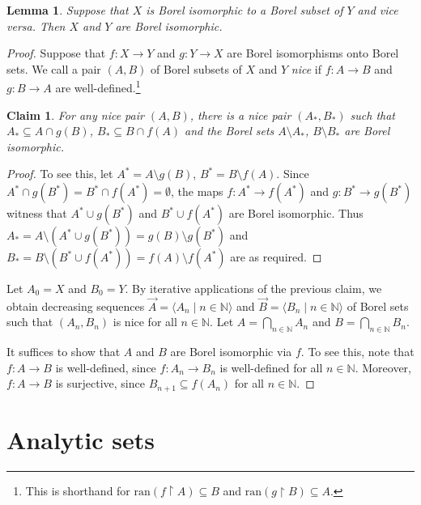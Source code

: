 \documentclass[10pt]{amsart}
\newcommand{\ran}{\mathrm{ran}}
\newcommand{\NN}{\mathbb{N}}
\newtheorem{lemma}[theorem]{Lemma}
\newtheorem*{claim*}{Claim}
\theoremstyle{definition}
\theoremstyle{remark}
\begin{document}
\begin{lemma} 
Suppose that $X$ is Borel isomorphic to a Borel subset of $Y$ and vice versa. 
Then $X$ and $Y$ are Borel isomorphic. 
\end{lemma} 
\begin{proof} 
Suppose that $f\colon X\rightarrow Y$ and $g\colon Y\rightarrow X$ are Borel isomorphisms onto Borel sets. 
We call a pair $(A,B)$ of Borel subsets of $X$ and $Y$ \emph{nice} if $f\colon A\rightarrow B$ and $g\colon B\rightarrow A$ are well-defined.\footnote{This is shorthand for $\ran(f{\upharpoonright}A)\subseteq B$ and $\ran(g{\upharpoonright}B)\subseteq A$. } 

\begin{claim*} 
For any nice pair $(A,B)$, there is a nice pair $(A_*,B_*)$ such that $A_*\subseteq A\cap g(B)$, $B_*\subseteq B\cap f(A)$ and the Borel sets $A\setminus A_*$, $B\setminus B_*$ are Borel isomorphic. 
\end{claim*} 
\begin{proof} 
To see this, let $A^*=A\setminus g(B)$, $B^*=B\setminus f(A)$. 
Since $A^*\cap g(B^*)=B^*\cap f(A^*)=\emptyset$, the maps $f\colon A^*\rightarrow f(A^*)$ and $g\colon B^*\rightarrow g(B^*)$ witness that 
$A^*\cup g(B^*)$ and $B^*\cup f(A^*)$ are Borel isomorphic. 
Thus $A_*=A\setminus (A^*\cup g(B^*))=g(B) \setminus g(B^*)$ and $B_*=B\setminus (B^*\cup f(A^*))=f(A)\setminus f(A^*)$ are as required. 
\end{proof} 

Let $A_0=X$ and $B_0=Y$. By iterative applications of the previous claim, we obtain decreasing sequences $\vec{A}=\langle A_n\mid n\in\NN\rangle$ and $\vec{B}=\langle B_n\mid n\in\NN\rangle$ of Borel sets such that $(A_n, B_n)$ is nice for all $n\in\NN$. Let $A=\bigcap_{n\in\NN} A_n$ and $B=\bigcap_{n\in\NN}B_n$. 

It suffices to show that $A$ and $B$ are Borel isomorphic via $f$. 
To see this, note that $f\colon A\rightarrow B$ is well-defined, since $f\colon A_n\rightarrow B_n$ is well-defined for all $n\in\NN$. 
Moreover, $f\colon A\rightarrow B$ is surjective, since $B_{n+1}\subseteq f(A_n)$ for all $n\in \NN$. 
\end{proof} 

\fi 





\section{Analytic sets} 
\end{document}
